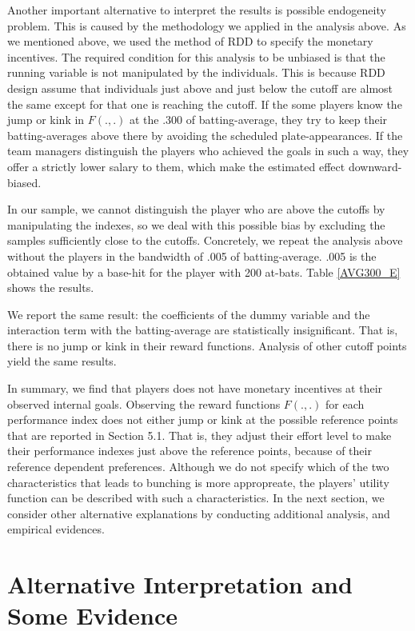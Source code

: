 \documentclass[dvipdfmx, 12pt]{article}
\begin{document}
Another important alternative to interpret the results is possible  endogeneity problem. This is caused by the methodology we applied in the analysis above. As we mentioned above, we used the method of RDD to specify the monetary incentives. The required condition for this analysis to be unbiased is that the running variable is not manipulated by the individuals. This is because RDD design assume that individuals just above and just below the cutoff are almost the same except for that one is reaching the cutoff. If the some players know the jump or kink in $F(.,.)$ at the .300 of batting-average, they try to keep their batting-averages above there by avoiding the scheduled plate-appearances. If the team managers distinguish the players who achieved the goals in such a way, they offer a strictly lower salary to them, which make the estimated effect downward-biased.

In our sample, we cannot distinguish the player who are above the cutoffs by manipulating the indexes, so we deal with this possible bias by excluding the samples sufficiently close to the cutoffs. Concretely, we repeat the analysis above without the players in the bandwidth of .005 of batting-average. .005 is the obtained value by a base-hit for the player with 200 at-bats. Table \ref{AVG300_E} shows the results.

We report the same result: the coefficients of the dummy variable and the interaction term with the batting-average are statistically insignificant. That is, there is no jump or kink in their reward functions. Analysis of other cutoff points yield the same results.

In summary, we find that players does not have monetary incentives at their observed internal goals. Observing the reward functions $F(.,.)$ for each performance index does not either jump or kink at the possible reference points that are reported in Section 5.1. That is, they adjust their effort level to make their performance indexes just above the reference points, because of their reference dependent preferences. Although we do not specify which of the two characteristics that leads to bunching is more appropreate, the players' utility function can be described with such a characteristics. In the next section, we consider other alternative explanations by conducting additional analysis, and empirical evidences.





\section{Alternative Interpretation and Some Evidence}
\end{document}
